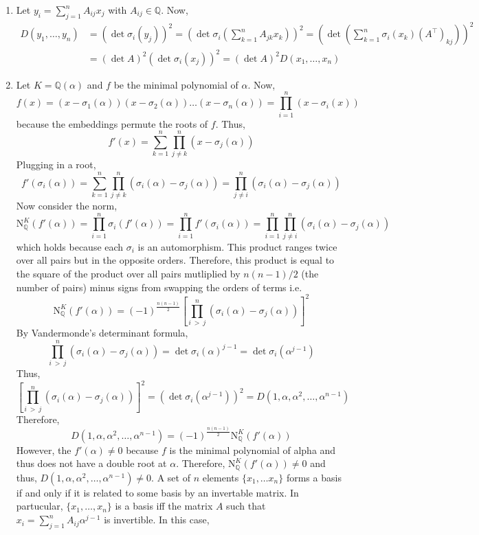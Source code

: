 \documentclass[12pt]{extarticle}
\newcommand{\Q}{\mathbb{Q}}
\newcommand{\qnorm}[2]{\mathrm{N}^{#1}_{\Q}\left(#2\right)}
\begin{document}
\begin{enumerate}
\begin{enumerate}
\item Let $y_i = \sum\limits_{j = 1}^n A_{ij} x_j$ with $A_{ij} \in \Q$. Now, 
\begin{align*}
D(y_1, \dots, y_n) &= (\det{\sigma_i(y_j)})^2 = \left(\det{\sigma_i \left(\sum\limits_{k = 1}^n A_{jk} x_k \right)} \right)^2 = \left(\det{\left( \sum\limits_{k = 1}^n \sigma_i \left( x_k \right) (A^\top)_{kj} \right)} \right)^2 \\ &= (\det{A})^2 (\det{\sigma_i(x_j)})^2 = (\det{A})^2 D(x_1, \dots, x_n)
\end{align*}

\item Let $K = \Q(\alpha)$ and $f$ be the minimal polynomial of $\alpha$. Now,
\[f(x) = (x - \sigma_1(\alpha)) (x - \sigma_2(\alpha)) \dots (x - \sigma_n(\alpha)) = \prod_{i = 1}^n (x - \sigma_i(x)) \]
because the embeddings permute the roots of $f$. Thus, 
\[f'(x) = \sum_{k = 1}^n \prod_{j \neq k}^n (x - \sigma_j(\alpha))\]
Plugging in a root,
\[f'(\sigma_i(\alpha)) = \sum_{k = 1}^n \prod_{j \neq k}^n (\sigma_i(\alpha) - \sigma_j(\alpha)) = \prod_{j \neq i}^n (\sigma_i(\alpha) - \sigma_j(\alpha))\]
Now consider the norm, 
\[\qnorm{K}{f'(\alpha)} = \prod_{i = 1}^n \sigma_i(f'(\alpha)) = \prod_{i = 1}^n f'(\sigma_i(\alpha)) = \prod_{i = 1}^n \prod_{j \neq i}^n (\sigma_i(\alpha) - \sigma_j(\alpha))\]
which holds because each $\sigma_i$ is an automorphism. This product ranges twice over all pairs but in the opposite orders. Therefore, this product is equal to the square of the product over all pairs mutliplied by $n(n-1)/2$ (the number of pairs) minus signs from swapping the orders of terms i.e.
\[ \qnorm{K}{f'(\alpha)} =  (-1)^{\frac{n(n-1)}{2}} \left[ \prod_{i \: > \: j}^n (\sigma_i(\alpha) - \sigma_j(\alpha)) \right]^2 \]
By Vandermonde's determinant formula, 
\[\prod_{i \: > \: j}^n (\sigma_i(\alpha) - \sigma_j(\alpha)) = \det{\sigma_i(\alpha)^{j-1}} = \det{\sigma_i (\alpha^{j-1})}\]
Thus, \[\left[\prod_{i \: > \: j}^n (\sigma_i(\alpha) - \sigma_j(\alpha)) \right]^2 = (\det{\sigma_i (\alpha^{j-1})})^2 = D(1, \alpha, \alpha^2, \dots, \alpha^{n-1}) \]
Therefore, \[D(1, \alpha, \alpha^2, \dots, \alpha^{n-1}) = (-1)^{\frac{n(n-1)}{2}} \qnorm{K}{f'(\alpha)}\]
However, the $f'(\alpha) \neq 0$ because $f$ is the minimal polynomial of alpha and thus does not have a double root at $\alpha$. Therefore, $\qnorm{K}{f'(\alpha)} \neq 0$ and thus,
$D(1, \alpha, \alpha^2, \dots, \alpha^{n-1}) \neq 0$. A set of $n$ elements $\{x_1, \dots x_n\}$ forms a basis if and only if it is related to some basis by an invertable matrix. In partucular, $\{x_1, \dots, x_n\}$ is a basis iff the matrix $A$ such that $x_i = \sum\limits_{j = 1}^n A_{ij} \alpha^{j-1}$ is invertible. In this case, 

\end{enumerate}
\end{enumerate}
\end{document}
